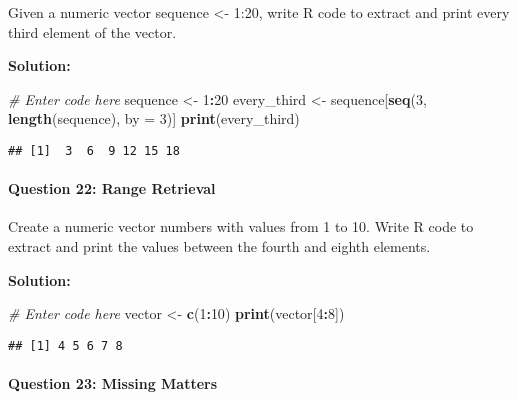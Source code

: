 \documentclass[
]{article}
\newenvironment{Shaded}{\begin{snugshade}}{\end{snugshade}}
\newcommand{\AttributeTok}[1]{\textcolor[rgb]{0.13,0.29,0.53}{#1}}
\newcommand{\CommentTok}[1]{\textcolor[rgb]{0.56,0.35,0.01}{\textit{#1}}}
\newcommand{\DecValTok}[1]{\textcolor[rgb]{0.00,0.00,0.81}{#1}}
\newcommand{\FunctionTok}[1]{\textcolor[rgb]{0.13,0.29,0.53}{\textbf{#1}}}
\newcommand{\NormalTok}[1]{#1}
\newcommand{\OtherTok}[1]{\textcolor[rgb]{0.56,0.35,0.01}{#1}}
\newcommand{\SpecialCharTok}[1]{\textcolor[rgb]{0.81,0.36,0.00}{\textbf{#1}}}
\begin{document}
Given a numeric vector sequence \textless- 1:20, write R code to extract
and print every third element of the vector.

\textbf{Solution:}

\begin{Shaded}
\begin{Highlighting}[]
\CommentTok{\# Enter code here}
\NormalTok{sequence }\OtherTok{\textless{}{-}} \DecValTok{1}\SpecialCharTok{:}\DecValTok{20}
\NormalTok{every\_third }\OtherTok{\textless{}{-}}\NormalTok{ sequence[}\FunctionTok{seq}\NormalTok{(}\DecValTok{3}\NormalTok{, }\FunctionTok{length}\NormalTok{(sequence), }\AttributeTok{by =} \DecValTok{3}\NormalTok{)]}
\FunctionTok{print}\NormalTok{(every\_third)}
\end{Highlighting}
\end{Shaded}

\begin{verbatim}
## [1]  3  6  9 12 15 18
\end{verbatim}

\hypertarget{question-22-range-retrieval}{%
\paragraph{Question 22: Range
Retrieval}\label{question-22-range-retrieval}}

Create a numeric vector numbers with values from 1 to 10. Write R code
to extract and print the values between the fourth and eighth elements.

\textbf{Solution:}

\begin{Shaded}
\begin{Highlighting}[]
\CommentTok{\# Enter code here}
\NormalTok{vector }\OtherTok{\textless{}{-}} \FunctionTok{c}\NormalTok{(}\DecValTok{1}\SpecialCharTok{:}\DecValTok{10}\NormalTok{)}
\FunctionTok{print}\NormalTok{(vector[}\DecValTok{4}\SpecialCharTok{:}\DecValTok{8}\NormalTok{])}
\end{Highlighting}
\end{Shaded}

\begin{verbatim}
## [1] 4 5 6 7 8
\end{verbatim}

\hypertarget{question-23-missing-matters}{%
\paragraph{Question 23: Missing
Matters}\label{question-23-missing-matters}}
\end{document}
